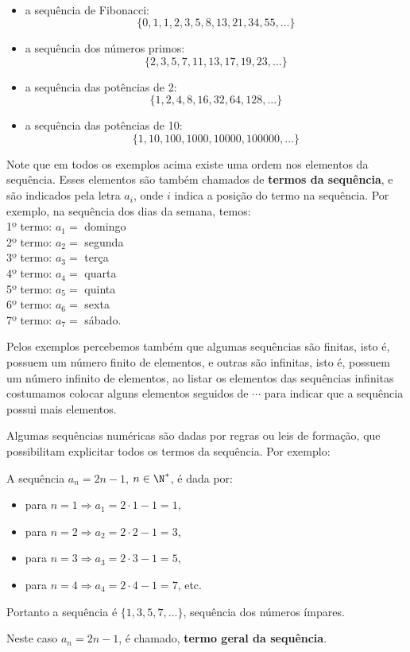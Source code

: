 \begin{exem}
\begin{itemize}
\begin{multline*}
\end{multline*}
  \item a sequência de Fibonacci: \\
\[
\{0, 1, 1, 2, 3, 5, 8, 13, 21, 34, 55, \ldots \}
\]
  \item a sequência dos números primos: \\
\[
\{2, 3, 5, 7, 11, 13, 17, 19, 23, \ldots \}
\]
  \item a sequência das potências de 2: \\
\[
\{1, 2, 4, 8, 16, 32, 64, 128, \ldots \}
\]
  \item a sequência das potências de 10: \\
\[
\{1, 10, 100, 1000, 10000, 100000, \ldots \}
\]
  \end{itemize}

\end{exem}

 Note que em todos os exemplos acima existe uma ordem nos elementos da sequência. Esses elementos são também chamados de \textbf{termos da sequência}, e são indicados pela letra $a_i$, onde $i$ indica a posição do termo na sequência. Por exemplo, na sequência dos dias da semana, temos: \\
 1º termo: $a_1=$ domingo\\
 2º termo: $a_2=$ segunda\\
 3º termo: $a_3=$ terça\\
 4º termo: $a_4=$ quarta\\
 5º termo: $a_5=$ quinta\\
 6º termo: $a_6=$ sexta \\
 7º termo: $a_7=$ sábado.

 Pelos exemplos percebemos também que algumas sequências são finitas, isto é, possuem um número finito de elementos, e outras são infinitas, isto é, possuem um número infinito de elementos, ao listar os elementos das sequências infinitas costumamos colocar alguns elementos seguidos de $\cdots$ para indicar que a sequência possui mais elementos.

 Algumas sequências numéricas são dadas por regras ou leis de formação, que possibilitam explicitar todos os termos da sequência. Por exemplo:
 \begin{exem}
  A sequência $a_n= 2n-1$, $n \in \N^{\ast}$, é dada por:
  \begin{itemize}
   \item para $n=1 \Rightarrow a_1=2\cdot 1 - 1= 1$,
   \item para $n=2 \Rightarrow a_2=2\cdot 2 - 1= 3$,
   \item para $n=3 \Rightarrow a_3=2\cdot 3 - 1= 5$,
   \item para $n=4 \Rightarrow a_4=2\cdot 4 - 1= 7$, etc.
  \end{itemize}
 Portanto a sequência é $\{1, 3, 5, 7, \ldots \}$, sequência dos números ímpares.

 Neste caso $a_n= 2n-1$, é chamado, \textbf{termo geral da sequência}.
 \end{exem}

